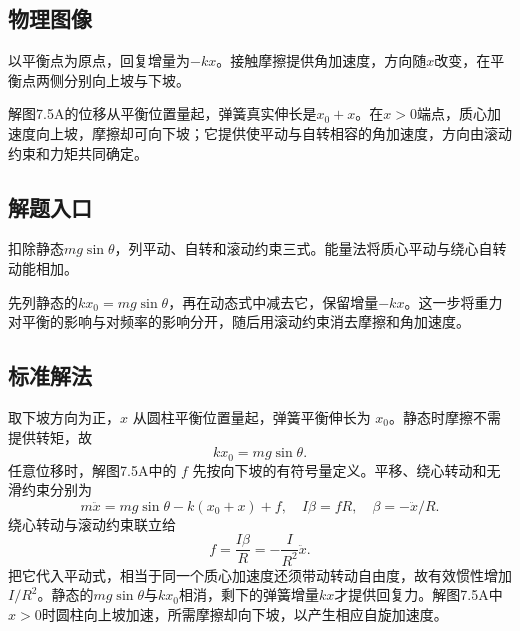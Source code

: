 \documentclass[UTF8,fontset=fandol,a4paper,11pt]{ctexart}
\newcommand{\figcaption}[1]{\par\vspace{2pt}{\small\color{muted}#1}\par}
\begin{document}

\subsection*{物理图像}

以平衡点为原点，回复增量为\(-kx\)。接触摩擦提供角加速度，方向随$x$改变，在平衡点两侧分别向上坡与下坡。

解图7.5A的位移从平衡位置量起，弹簧真实伸长是$x_0+x$。在$x>0$端点，质心加速度向上坡，摩擦却可向下坡；它提供使平动与自转相容的角加速度，方向由滚动约束和力矩共同确定。




\subsection*{解题入口}

扣除静态\(mg\sin\theta\)，列平动、自转和滚动约束三式。能量法将质心平动与绕心自转动能相加。

先列静态的$kx_0=mg\sin\theta$，再在动态式中减去它，保留增量$-kx$。这一步将重力对平衡的影响与对频率的影响分开，随后用滚动约束消去摩擦和角加速度。





\subsection*{标准解法}

\begin{center}\begin{minipage}{\linewidth}\centering{}\figcaption{解图 7.5A}\end{minipage}\end{center}
取下坡方向为正，$x$ 从圆柱平衡位置量起，弹簧平衡伸长为 $x_0$。静态时摩擦不需提供转矩，故
\[kx_0=mg\sin\theta.\]
任意位移时，解图7.5A中的 $f$ 先按向下坡的有符号量定义。平移、绕心转动和无滑约束分别为
\[m\ddot x=mg\sin\theta-k(x_0+x)+f,
\quad I\beta=fR,\quad\beta=-\ddot x/R.\]
绕心转动与滚动约束联立给
\[f=\frac{I\beta}{R}=-\frac I{R^2}\ddot x.\]
把它代入平动式，相当于同一个质心加速度还须带动转动自由度，故有效惯性增加$I/R^2$。静态的$mg\sin\theta$与$kx_0$相消，剩下的弹簧增量$kx$才提供回复力。解图7.5A中$x>0$时圆柱向上坡加速，所需摩擦却向下坡，以产生相应自旋加速度。
\end{document}
